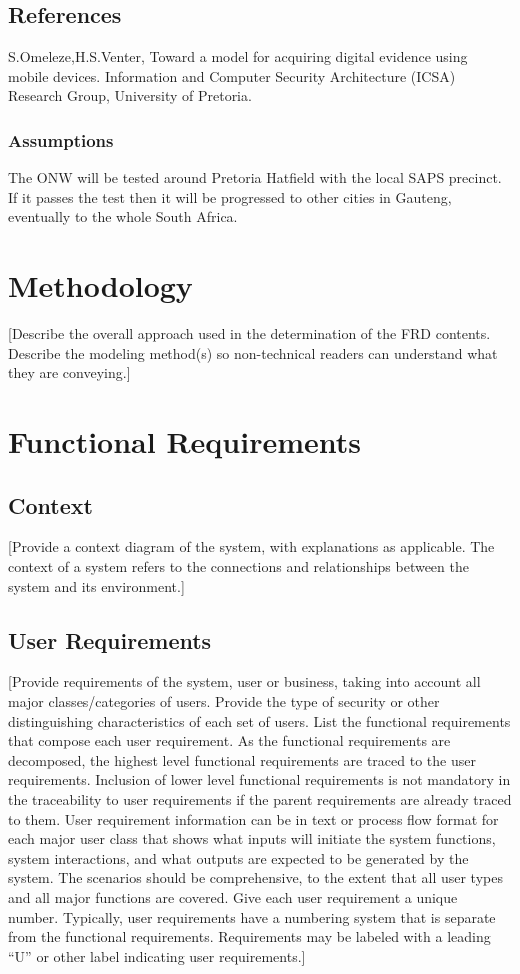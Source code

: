 \documentclass[a4paper,12pt]{article}
\begin{document}
\subsection{References}
S.Omeleze,H.S.Venter, Toward a model for acquiring digital evidence using mobile devices. Information and Computer Security Architecture (ICSA) Research Group, University of Pretoria.

\subsubsection{Assumptions}
The ONW will be tested around Pretoria Hatfield with the local SAPS precinct. If it passes the test then it will be progressed to other cities in Gauteng, eventually to the whole South Africa. 

\section{Methodology}
[Describe the overall approach used in the determination of the FRD contents.  Describe the modeling method(s) so non-technical readers can understand what they are conveying.]

\section{Functional Requirements}
\subsection{Context}
[Provide a context diagram of the system, with explanations as applicable.  The context of a system refers to the connections and relationships between the system and its environment.]

\subsection{User Requirements}
[Provide requirements of the system, user or business, taking into account all major classes/categories of users.  Provide the type of security or other distinguishing characteristics of each set of users.  List the functional requirements that compose each user requirement.  As the functional requirements are decomposed, the highest level functional requirements are traced to the user requirements.  Inclusion of lower level functional requirements is not mandatory in the traceability to user requirements if the parent requirements are already traced to them.
User requirement information can be in text or process flow format for each major user class that shows what inputs will initiate the system functions, system interactions, and what outputs are expected to be generated by the system.  The scenarios should be comprehensive, to the extent that all user types and all major functions are covered.  Give each user requirement a unique number.  Typically, user requirements have a numbering system that is separate from the functional requirements.  Requirements may be labeled with a leading “U” or other label indicating user requirements.]
\end{document}
